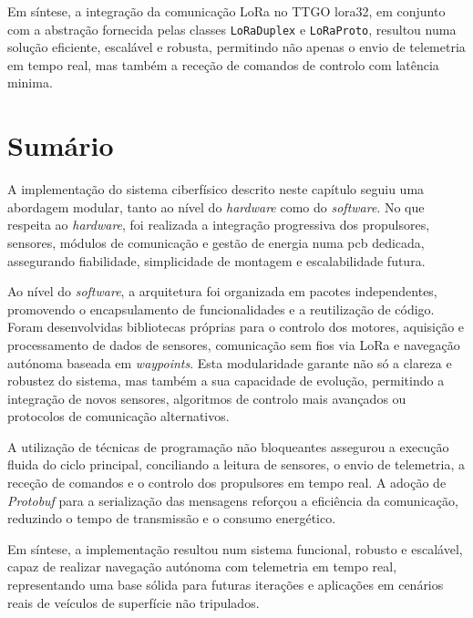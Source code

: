 Em síntese, a integração da comunicação LoRa no TTGO \gls{lora}32, em conjunto com a abstração fornecida pelas classes \texttt{LoRaDuplex} e \texttt{LoRaProto}, resultou numa solução eficiente, escalável e robusta, permitindo não apenas o envio de telemetria em tempo real, mas também a receção de comandos de controlo com latência minima.

\section{Sumário}
\label{sec:implementacao-sumario}

A implementação do sistema ciberfísico descrito neste capítulo seguiu uma abordagem modular, tanto ao nível do \emph{hardware} como do \emph{\emph{software}}. No que respeita ao \emph{\emph{hardware}}, foi realizada a integração progressiva dos propulsores, sensores, módulos de comunicação e gestão de energia numa \gls{pcb} dedicada, assegurando fiabilidade, simplicidade de montagem e escalabilidade futura.  

Ao nível do \emph{\emph{software}}, a arquitetura foi organizada em pacotes independentes, promovendo o encapsulamento de funcionalidades e a reutilização de código. Foram desenvolvidas bibliotecas próprias para o controlo dos motores, aquisição e processamento de dados de sensores, comunicação sem fios via LoRa e navegação autónoma baseada em \emph{waypoints}. Esta modularidade garante não só a clareza e robustez do sistema, mas também a sua capacidade de evolução, permitindo a integração de novos sensores, algoritmos de controlo mais avançados ou protocolos de comunicação alternativos.  

A utilização de técnicas de programação não bloqueantes assegurou a execução fluida do ciclo principal, conciliando a leitura de sensores, o envio de telemetria, a receção de comandos e o controlo dos propulsores em tempo real. A adoção de \emph{Protobuf} para a serialização das mensagens reforçou a eficiência da comunicação, reduzindo o tempo de transmissão e o consumo energético.  

Em síntese, a implementação resultou num sistema funcional, robusto e escalável, capaz de realizar navegação autónoma com telemetria em tempo real, representando uma base sólida para futuras iterações e aplicações em cenários reais de veículos de superfície não tripulados.

